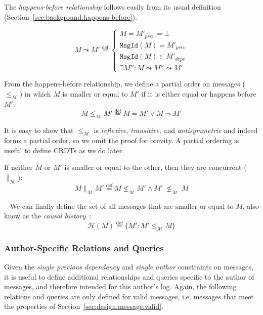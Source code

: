 \documentclass[9pt, oneside]{article}   	%
\newcommand{\defeq}{\overset{\mathrm{def}}{=}}
\begin{document}
The \textit{happens-before relationship} follows easily from its usual definition (Section~\ref{sec:background:happens-before}):

\begin{equation}
	M \leadsto M' \defeq \begin{cases}
		M = M'_\textit{prev} = \bot \\
		\texttt{MsgId}(M) = M'_\textit{prev} \\
		\texttt{MsgId}(M) \in  M'_\textit{deps} \\
		\exists M'' : M \leadsto M'' \leadsto M'
	\end{cases}
\end{equation}

From the happens-before relationship, we define a partial order on messages ($\leq_\mathcal{M}$) in which $M$ is smaller or equal to $M'$ if it is either equal or happens before $M'$:
\begin{equation}
	M \leq_\mathcal{M} M' \defeq M = M' \vee M \leadsto M' 
\end{equation}

It is easy to show that $\leq_\mathcal{M}$ is \textit{reflexive}, \textit{transitive}, and \textit{antisymmetric} and indeed forms a partial order, so we omit the proof for brevity. A partial ordering is useful to define CRDTs as we do later.

If neither $M$ or $M'$ is smaller or equal to the other, then they are concurrent ($\parallel_\mathcal{M}$):
\begin{equation}
	M \parallel_\mathcal{M} M' \defeq M \not\leq_\mathcal{M} M' \wedge M' ~\not\leq_\mathcal{M}~ M
\end{equation}

~\newline
We can finally define the set of all messages that are smaller or equal to $M$, also know as the \textit{causal history}~\cite{schwarz1994detecting}:
\begin{equation}
	\mathcal{H}(M) \defeq \{ M' : M' \leq_\mathcal{M} M \} 
\end{equation}

\subsubsection{Author-Specific Relations and Queries}
\label{sec:design:writer-rel-queries}

Given the \textit{single previous dependency} and \textit{single author} constraints on messages, it is useful to define additional relationships and queries specific to the author of messages, and therefore intended for this author's log. Again, the following relations and queries are only defined for valid messages, i.e. messages that meet the properties of Section~\ref{sec:design:message:valid}.
\end{document}
